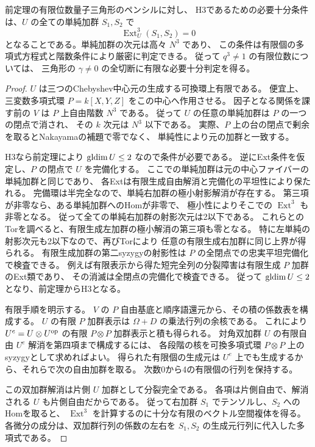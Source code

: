 \begin{corollary}\label{cor:cubic-CY-three-alpha-triangle-finite-effective}
前定理の有限位数量子三角形のペンシルに対し、
H3であるための必要十分条件は、$U$ の全ての単純加群 $S_1,S_2$ で
\[
 \operatorname{Ext}^3_U(S_1,S_2)=0
\]
となることである。単純加群の次元は高々 $N^3$ であり、
この条件は有限個の多項式方程式と階数条件により厳密に判定できる。
従って $q^3\ne1$ の有限位数については、
三角形の $\gamma\ne0$ の全切断に有限な必要十分判定を得る。
\end{corollary}
\begin{proof}
$U$ は三つのChebyshev中心元の生成する可換環上有限である。
便宜上、三変数多項式環 $P=k[X,Y,Z]$ をこの中心へ作用させる。
因子となる関係を課す前の $V$ は $P$ 上自由階数 $N^3$ である。
従って $U$ の任意の単純加群は $P$ の一つの閉点で消され、
その $k$ 次元は $N^3$ 以下である。
実際、$P$ 上の台の閉点で剰余を取るとNakayamaの補題で零でなく、
単純性により元の加群と一致する。

H3なら前定理により $\operatorname{gldim} U\le2$ なので条件が必要である。
逆にExt条件を仮定し、$P$ の閉点で $U$ を完備化する。
ここでの単純加群は元の中心ファイバーの単純加群と同じであり、
各Extは有限生成自由解消と完備化の平坦性により保たれる。
完備環は半完全なので、単純右加群の極小射影解消が存在する。
第三項が非零なら、ある単純加群へのHomが非零で、
極小性によりそこでの $\operatorname{Ext}^3$ も非零となる。
従って全ての単純右加群の射影次元は2以下である。
これらとのTorを調べると、有限生成左加群の極小解消の第三項も零となる。
特に左単純の射影次元も2以下なので、再びTorにより
任意の有限生成右加群に同じ上界が得られる。
有限生成加群の第二syzygyの射影性は $P$ の全閉点での忠実平坦完備化で検査できる。
例えば有限表示から得た短完全列の分裂障害は有限生成 $P$ 加群のExt類であり、
その消滅は全閉点の完備化で検査できる。
従って $\operatorname{gldim} U\le2$ となり、前定理からH3となる。

有限手順を明示する。
$V$ の $P$ 自由基底と順序語還元から、その積の係数表を構成する。
$U$ の有限 $P$ 加群表示は $\Omega+D$ の乗法行列の余核である。
これにより $U^e=U\otimes U^{\rm op}$ の有限 $P\otimes P$ 加群表示と積も得られる。
対角双加群 $U$ の有限自由 $U^e$ 解消を第四項まで構成するには、
各段階の核を可換多項式環 $P\otimes P$ 上のsyzygyとして求めればよい。
得られた有限個の生成元は $U^e$ 上でも生成するから、それらで次の自由加群を取る。
次数0から4の有限個の行列を保持する。

この双加群解消は片側 $U$ 加群として分裂完全である。
各項は片側自由で、解消される $U$ も片側自由だからである。
従って右加群 $S_1$ でテンソルし、$S_2$ へのHomを取ると、
$\operatorname{Ext}^3$ を計算するのに十分な有限のベクトル空間複体を得る。
各微分の成分は、双加群行列の係数の左右を
$S_1,S_2$ の生成元行列に代入した多項式である。


\end{proof}
